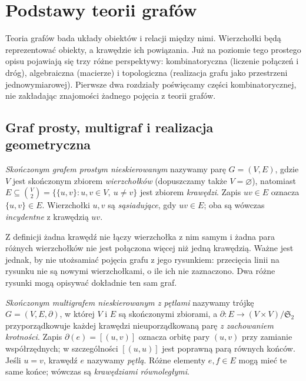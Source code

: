 \chapter{Podstawy teorii grafów}
\label{ch:tg-podstawy}

Teoria grafów bada układy obiektów i relacji między nimi. Wierzchołki będą
reprezentować obiekty, a krawędzie ich powiązania. Już na poziomie tego
prostego opisu pojawiają się trzy różne perspektywy: kombinatoryczna
(liczenie połączeń i dróg), algebraiczna (macierze) i topologiczna
(realizacja grafu jako przestrzeni jednowymiarowej). Pierwsze dwa rozdziały
poświęcamy części kombinatorycznej, nie zakładając znajomości żadnego
pojęcia z teorii grafów.

\section{Graf prosty, multigraf i realizacja geometryczna}
\label{sec:tg-obiekty}

\begin{definicja}
\emph{Skończonym grafem prostym nieskierowanym} nazywamy parę
$G=(V,E)$, gdzie $V$ jest skończonym zbiorem
\emph{wierzchołków} (dopuszczamy także $V=\varnothing$), natomiast
$E\subseteq\binom V2=\{\{u,v\}:u,v\in V,\ u\ne v\}$
jest zbiorem \emph{krawędzi}. Zapis $uv\in E$ oznacza
$\{u,v\}\in E$. Wierzchołki $u,v$ są \emph{sąsiadujące},
gdy $uv\in E$; oba są wówczas \emph{incydentne}
z krawędzią $uv$.
\end{definicja}

Z definicji żadna krawędź nie łączy wierzchołka z nim samym i żadna para
różnych wierzchołków nie jest połączona więcej niż jedną krawędzią.
Ważne jest jednak, by nie utożsamiać pojęcia grafu z jego rysunkiem:
przecięcia linii na rysunku nie są nowymi wierzchołkami, o ile ich
nie zaznaczono. Dwa różne rysunki mogą opisywać dokładnie ten sam graf.

\begin{definicja}
\emph{Skończonym multigrafem nieskierowanym z pętlami}
nazywamy trójkę $G=(V,E,\partial)$, w której $V$ i $E$ są
skończonymi zbiorami, a $\partial:E\to (V\times V)/\mathfrak S_2$
przyporządkowuje każdej krawędzi nieuporządkowaną parę
\emph{z zachowaniem krotności}. Zapis $\partial(e)=[(u,v)]$
oznacza orbitę pary $(u,v)$ przy zamianie współrzędnych;
w szczególności $[(u,u)]$ jest poprawną parą równych końców.
Jeśli $u=v$, krawędź $e$ nazywamy \emph{pętlą}.
Różne elementy $e,f\in E$ mogą mieć te same końce;
wówczas są \emph{krawędziami równoległymi}.
\end{definicja}

